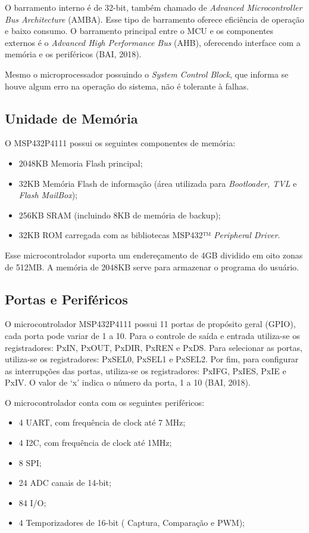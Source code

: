 O barramento interno é de 32-bit, também chamado de \textit{Advanced Microcontroller Bus Architecture} (AMBA). Esse tipo de barramento oferece eficiência de operação e baixo consumo. O barramento principal entre o MCU e os componentes externos é o \textit{Advanced High Performance Bus} (AHB), oferecendo interface com a memória e os periféricos (BAI, 2018).

Mesmo o microprocessador possuindo o \textit{System Control Block}, que informa se houve algum erro na operação do sistema, não é tolerante à falhas. 

\subsection{Unidade de Memória}

O MSP432P4111 possui os seguintes componentes de memória:

\begin{itemize}
\item 2048KB Memoria Flash principal;
\item 32KB Memória Flash de informação (área utilizada para \textit{Bootloader, TVL} e \textit{Flash MailBox});
\item 256KB SRAM (incluindo 8KB de memória de backup);
\item 32KB ROM carregada com as bibliotecas MSP432™ \textit{Peripheral Driver}.
\end{itemize}

Esse microcontrolador suporta um endereçamento de 4GB dividido em oito zonas de 512MB. A memória de 2048KB serve para armazenar o programa do usuário.

\subsection{Portas e Periféricos}

O microcontrolador MSP432P4111 possui 11 	portas de propósito geral (GPIO), cada porta pode variar de 1 a 10. Para o controle de saída e entrada utiliza-se os registradores: PxIN, PxOUT, PxDIR, PxREN e PxDS. Para selecionar as portas, utiliza-se os registradores: PxSEL0, PxSEL1 e PxSEL2. Por fim, para configurar as interrupções das portas, utiliza-se os registradores: PxIFG, PxIES, PxIE e PxIV. O valor de ‘x’ indica o número da porta, 1 a 10 (BAI, 2018).

O microcontrolador conta com os seguintes periféricos:

\begin{itemize}
\item 4 UART, com frequência de clock até 7 MHz;
\item 4 I2C, com frequência de clock até 1MHz;
\item 8 SPI;
\item 24 ADC canais de 14-bit;
\item 84 I/O;
\item 4 Temporizadores de 16-bit ( Captura, Comparação e PWM);
\end{itemize}

